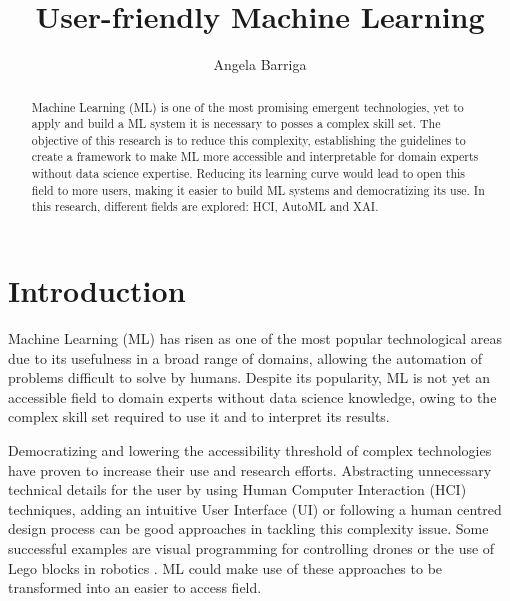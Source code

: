 \documentclass[runningheads]{llncs}
\begin{document}
%
\title{User-friendly Machine Learning}
%
%
\author{Angela Barriga}
%
%
%
\maketitle              %
%
\begin{abstract}
Machine Learning (ML) is one of the most promising emergent technologies, yet to apply and build a ML system it is necessary to posses a complex skill set. The objective of this research is to reduce this complexity, establishing the guidelines to create a framework to make ML more accessible and interpretable for domain experts without data science expertise. Reducing its learning curve would lead to open this field to more users, making it easier to build ML systems and democratizing its use. In this research, different fields are explored: HCI, AutoML and XAI.
\end{abstract}
%
%
%
\section{Introduction}\label{intro}


Machine Learning (ML) has risen as one of the most popular technological areas due to its usefulness in a broad range of domains, allowing the automation of problems difficult to solve by humans. Despite its popularity, ML is not yet an accessible field to domain experts without data science knowledge, owing to the complex skill set required to use it and to interpret its results.  

Democratizing and lowering the accessibility threshold of complex technologies have proven to increase their use and research efforts. Abstracting unnecessary technical details for the user by using Human Computer Interaction (HCI) techniques, adding an intuitive User Interface (UI) or following a human centred design process can be good approaches in tackling this complexity issue. Some successful examples are visual programming for controlling drones \cite{dronely} or the use of Lego blocks in robotics \cite{lego}. ML could make use of these approaches to be transformed into an easier to access field. 
\end{document}
